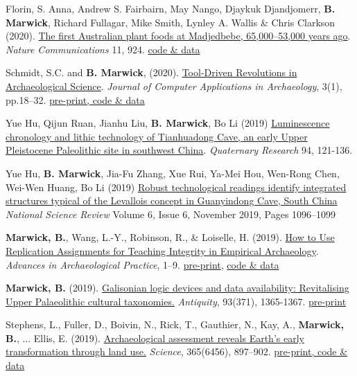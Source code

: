 \documentclass[11pt,article,oneside]{memoir}
\begin{document}

\ind Florin, S. Anna, Andrew S. Fairbairn, May Nango, Djaykuk Djandjomerr, \textbf{B. Marwick}, Richard Fullagar, Mike Smith, Lynley A. Wallis & Chris Clarkson (2020). \href{https://doi.org/10.1038/s41467-020-14723-0}{The first Australian plant foods at Madjedbebe, 65,000–53,000 years ago}. \textit{Nature Communications} 11, 924. \href{https:doi.org/10.17605/OSF.IO/YDUZP }{code \& data}

\ind Schmidt, S.C. and \textbf{B. Marwick}, (2020). \href{http://doi.org/10.5334/jcaa.29}{Tool-Driven Revolutions in Archaeological Science}. \textit{Journal of Computer Applications in Archaeology}, 3(1), pp.18–32. \href{https:doi.org/10.17605/OSF.IO/RHVN5}{pre-print, code \& data}

\ind Yue Hu, Qijun Ruan, Jianhu Liu, \textbf{B. Marwick}, Bo Li (2019) \href{http://doi.org/10.1017/qua.2019.67}{Luminescence chronology and lithic technology of Tianhuadong Cave, an early Upper Pleistocene Paleolithic site in southwest China}. \textit{Quaternary Research} 94, 121-136.

\ind Yue Hu, \textbf{B. Marwick}, Jia-Fu Zhang, Xue Rui, Ya-Mei Hou, Wen-Rong Chen, Wei-Wen Huang, Bo Li (2019) \href{https://doi.org/10.1093/nsr/nwz192}{Robust technological readings identify integrated structures typical of the Levallois concept in Guanyindong Cave, South China} \textit{National Science Review} Volume 6, Issue 6, November 2019, Pages 1096–1099 

\ind \textbf{Marwick, B.}, Wang, L.-Y., Robinson, R., \& Loiselle, H. (2019). \href{https://doi.org/10.1017/aap.2019.38}{How to Use Replication Assignments for Teaching Integrity in Empirical Archaeology}. \textit{Advances in Archaeological Practice}, 1–9. \href{https://osf.io/preprints/socarxiv/tsxbv/}{pre-print}, \href{https://doi.org/10.17605/OSF.IO/DBSW9}{code \& data}

\ind \textbf{Marwick, B.} (2019). \href{https://doi.org/10.15184/aqy.2019.131}{Galisonian logic devices and data availability: Revitalising Upper Palaeolithic cultural taxonomies.} \textit{Antiquity}, 93(371), 1365-1367. \href{https://osf.io/preprints/socarxiv/v8dej/}{pre-print}

\ind Stephens, L., Fuller, D., Boivin, N., Rick, T., Gauthier, N., Kay, A., \textbf{Marwick, B.}, ...  Ellis, E. (2019). \href{https://doi.org/10.1126/science.aax1192}{Archaeological assessment reveals Earth’s early transformation through land use.} \textit{Science}, 365(6456), 897–902. \href{https://dataverse.harvard.edu/dataverse/ArchaeoGLOBE}{pre-print, code \& data}
\end{document}
